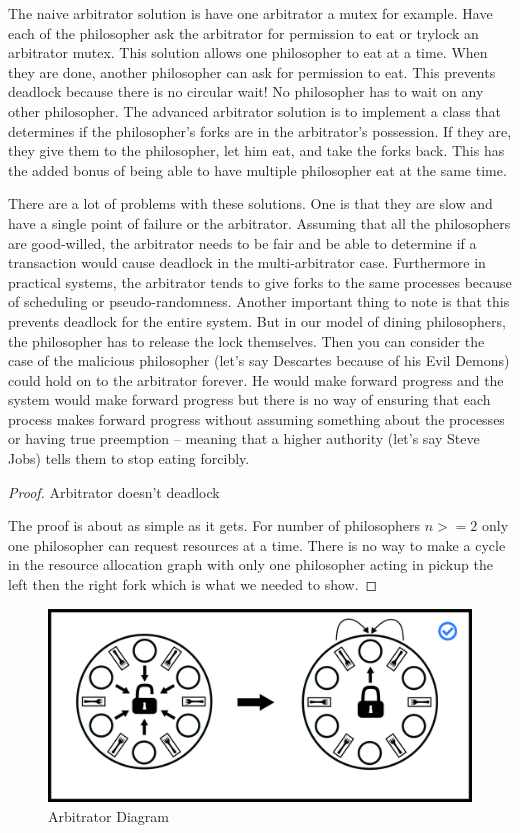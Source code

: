 The naive arbitrator solution is have one arbitrator a mutex for example.
Have each of the philosopher ask the arbitrator for permission to eat or trylock an arbitrator mutex.
This solution allows one philosopher to eat at a time.
When they are done, another philosopher can ask for permission to eat.
This prevents deadlock because there is no circular wait! No philosopher has to wait on any other philosopher.
The advanced arbitrator solution is to implement a class that determines if the philosopher's forks are in the arbitrator's possession.
If they are, they give them to the philosopher, let him eat, and take the forks back.
This has the added bonus of being able to have multiple philosopher eat at the same time.

There are a lot of problems with these solutions.
One is that they are slow and have a single point of failure or the arbitrator.
Assuming that all the philosophers are good-willed, the arbitrator needs to be fair and be able to determine if a transaction would cause deadlock in the multi-arbitrator case.
Furthermore in practical systems, the arbitrator tends to give forks to the same processes because of scheduling or pseudo-randomness.
Another important thing to note is that this prevents deadlock for the entire system.
But in our model of dining philosophers, the philosopher has to release the lock themselves.
Then you can consider the case of the malicious philosopher (let's say Descartes because of his Evil Demons) could hold on to the arbitrator forever.
He would make forward progress and the system would make forward progress but there is no way of ensuring that each process makes forward progress without assuming something about the processes or having true preemption -- meaning that a higher authority (let's say Steve Jobs) tells them to stop eating forcibly.


\begin{proof} Arbitrator doesn't deadlock

The proof is about as simple as it gets. For number of philosophers $n >= 2$ only one philosopher can request resources at a time. There is no way to make a cycle in the resource allocation graph with only one philosopher acting in pickup the left then the right fork which is what we needed to show.

\end{proof}

\begin{figure}[H]
\centering
\includegraphics[width=.9\textwidth]{deadlock/drawings/dining_arbitrator.png}
\caption{Arbitrator Diagram}
\end{figure}

